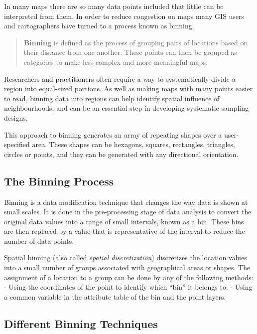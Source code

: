 \documentclass[
]{book}
\begin{document}
In many maps there are so many data points included that little can be interpreted from them. In order to reduce congestion on maps many GIS users and cartographers have turned to a process known as binning.

\begin{quote}
\textbf{Binning} is defined as the process of grouping pairs of locations based on their distance from one another. These points can then be grouped as categories to make less complex and more meaningful maps.
\end{quote}

Researchers and practitioners often require a way to systematically divide a region into equal-sized portions. As well as making maps with many points easier to read, binning data into regions can help identify spatial influence of neighbourhoods, and can be an essential step in developing systematic sampling designs.

This approach to binning generates an array of repeating shapes over a user-specified area. These shapes can be hexagons, squares, rectangles, triangles, circles or points, and they can be generated with any directional orientation.

\hypertarget{the-binning-process}{%
\subsection{The Binning Process}\label{the-binning-process}}

Binning is a data modification technique that changes the way data is shown at small scales. It is done in the pre-processing stage of data analysis to convert the original data values into a range of small intervals, known as a bin. These bins are then replaced by a value that is representative of the interval to reduce the number of data points.

Spatial binning (also called \emph{spatial discretization}) discretizes the location values into a small number of groups associated with geographical areas or shapes. The assignment of a location to a group can be done by any of the following methods:
- Using the coordinates of the point to identify which ``bin'' it belongs to.
- Using a common variable in the attribute table of the bin and the point layers.

\hypertarget{different-binning-techniques}{%
\subsection{Different Binning Techniques}\label{different-binning-techniques}}
\end{document}
